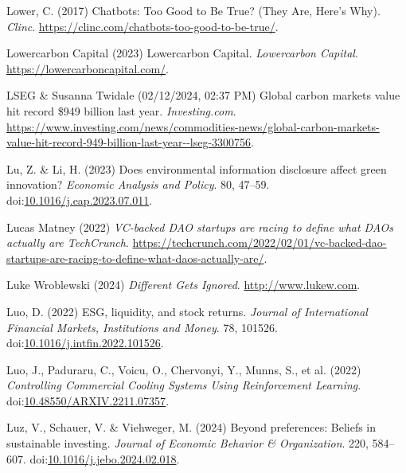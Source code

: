 \documentclass[
  letterpaper,
  DIV=11,
  numbers=noendperiod]{scrartcl}
\newlength{\cslhangindent}
\newenvironment{CSLReferences}[2] %
 {\begin{list}{}{%
  \setlength{\itemindent}{0pt}
  \setlength{\leftmargin}{0pt}
  \setlength{\parsep}{0pt}
  \ifodd #1
   \setlength{\leftmargin}{\cslhangindent}
   \setlength{\itemindent}{-1\cslhangindent}
  \fi
  \setlength{\itemsep}{#2\baselineskip}}}
 {\end{list}}
\begin{document}
\begin{CSLReferences}{0}{1}
Lower, C. (2017) Chatbots: {Too Good} to {Be True}? ({They Are},
{Here}'s {Why}). \emph{Clinc}.
\url{https://clinc.com/chatbots-too-good-to-be-true/}.

Lowercarbon Capital (2023) Lowercarbon {Capital}. \emph{Lowercarbon
Capital}. \url{https://lowercarboncapital.com/}.

LSEG \& Susanna Twidale (02/12/2024, 02:37 PM) Global carbon markets
value hit record \$949 billion last year. \emph{Investing.com}.
\url{https://www.investing.com/news/commodities-news/global-carbon-markets-value-hit-record-949-billion-last-year--lseg-3300756}.

Lu, Z. \& Li, H. (2023) Does environmental information disclosure affect
green innovation? \emph{Economic Analysis and Policy}. 80, 47--59.
doi:\href{https://doi.org/10.1016/j.eap.2023.07.011}{10.1016/j.eap.2023.07.011}.

Lucas Matney (2022) \emph{{VC-backed DAO} startups are racing to define
what {DAOs} actually are {\textbar} {TechCrunch}}.
\url{https://techcrunch.com/2022/02/01/vc-backed-dao-startups-are-racing-to-define-what-daos-actually-are/}.

Luke Wroblewski (2024) \emph{Different {Gets Ignored}}.
\url{http://www.lukew.com}.

Luo, D. (2022) {ESG}, liquidity, and stock returns. \emph{Journal of
International Financial Markets, Institutions and Money}. 78, 101526.
doi:\href{https://doi.org/10.1016/j.intfin.2022.101526}{10.1016/j.intfin.2022.101526}.

Luo, J., Paduraru, C., Voicu, O., Chervonyi, Y., Munns, S., et al.
(2022) \emph{Controlling {Commercial Cooling Systems Using Reinforcement
Learning}}.
doi:\href{https://doi.org/10.48550/ARXIV.2211.07357}{10.48550/ARXIV.2211.07357}.

Luz, V., Schauer, V. \& Viehweger, M. (2024) Beyond preferences:
{Beliefs} in sustainable investing. \emph{Journal of Economic Behavior
\& Organization}. 220, 584--607.
doi:\href{https://doi.org/10.1016/j.jebo.2024.02.018}{10.1016/j.jebo.2024.02.018}.


\end{CSLReferences}
\end{document}
